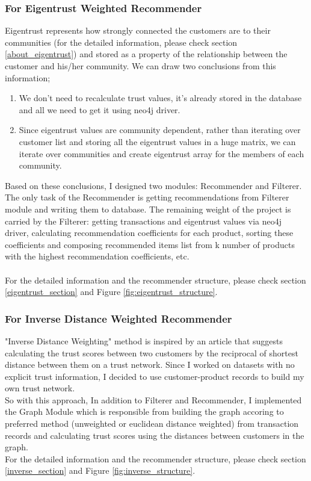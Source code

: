 \subsubsection{For Eigentrust Weighted Recommender}
Eigentrust represents how strongly connected the customers are to their communities (for the detailed information, please check section \ref{about_eigentrust}) and stored as a property of the relationship between the customer and his/her community. We can draw two conclusions from this information;
\begin{enumerate}
	\item We don't need to recalculate trust values, it's already stored in the database and all we need to get it using neo4j driver.
	\item Since eigentrust values are community dependent, rather than iterating over customer list and storing all the eigentrust values in a huge matrix, we can iterate over communities and create eigentrust array for the members of each community.
\end{enumerate}
Based on these conclusions, I designed two modules: Recommender and Filterer. The only task of the Recommender is getting recommendations from Filterer module and writing them to database.  The remaining weight of the project is carried by the Filterer: getting transactions and eigentrust values via neo4j driver, calculating recommendation coefficients for each product, sorting these coefficients and composing recommended items list from k number of products with the highest recommendation coefficients, etc. \\ \\
For the detailed information and the recommender structure, please check section \ref{eigentrust_section} and Figure \ref{fig:eigentrust_structure}.
\subsubsection{For Inverse Distance Weighted Recommender}
"Inverse Distance Weighting" method is inspired by an article\cite{inverse_article} that suggests calculating the trust scores between two customers by the reciprocal of shortest distance between them on a trust network. Since I worked on datasets with no explicit trust information, I decided to use customer-product records to build my own trust network. \\

So with this approach, In addition to Filterer and Recommender, I implemented the Graph Module which is responsible from building the graph accoring to preferred method (unweighted or euclidean distance weighted) from transaction records and calculating trust scores using the distances between customers in the graph. \\

For the detailed information and the recommender structure, please check section \ref{inverse_section} and Figure \ref{fig:inverse_structure}.
